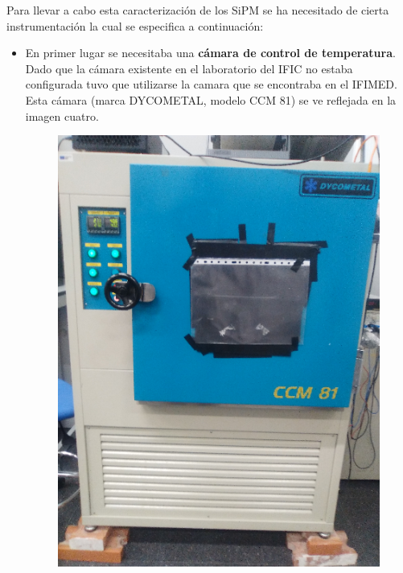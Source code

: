 Para llevar a cabo esta caracterización de los SiPM se ha necesitado de cierta instrumentación la cual se especifica a continuación:

\begin{itemize}
\item {} En primer lugar se necesitaba una \textbf{cámara de control de temperatura}. 
\newline
Dado que la cámara existente en el laboratorio del IFIC no estaba configurada tuvo que utilizarse la camara que se encontraba en el IFIMED. Esta cámara (marca DYCOMETAL, modelo CCM 81) se ve reflejada en la imagen cuatro.
\begin{figure}[htb]
\centering
{
\includegraphics[scale=0.15]{SistemaTemperatura.png} 
}
{
}
\end{figure}
\end{itemize}
